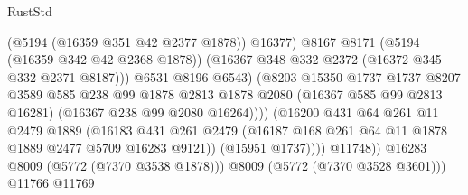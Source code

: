 \begin{lexlean}{RustStd}
\begin{coremodule}
                                            (@5194 (@16359 @351 @42 @2377 @1878))
                                            @16377)
                                          @8167
                                          @8171
                                          (@5194 (@16359 @342 @42 @2368 @1878))
                                          (@16367 @348 @332 @2372 (@16372 @345 @332 @2371 @8187)))
                                        @6531
                                        @8196
                                        @6543)
                                      (@8203
                                        @15350
                                        @1737
                                        @1737
                                        @8207
                                        @3589
                                        @585
                                        @238
                                        @99
                                        @1878
                                        @2813
                                        @1878
                                        @2080
                                        (@16367 @585 @99 @2813 @16281)
                                        (@16367 @238 @99 @2080 @16264))))
                                  (@16200
                                    @431
                                    @64
                                    @261
                                    @11
                                    @2479
                                    @1889
                                    (@16183
                                      @431
                                      @261
                                      @2479
                                      (@16187
                                        @168
                                        @261
                                        @64
                                        @11
                                        @1878
                                        @1889
                                        @2477
                                        @5709
                                        @16283
                                        @9121))
                                    (@15951 @1737))))
                              @11748))
                          @16283
                          @8009
                          (@5772 (@7370 @3538 @1878)))
                        @8009
                        (@5772 (@7370 @3528 @3601)))
                      @11766
                      @11769

\end{coremodule}
\end{lexlean}
